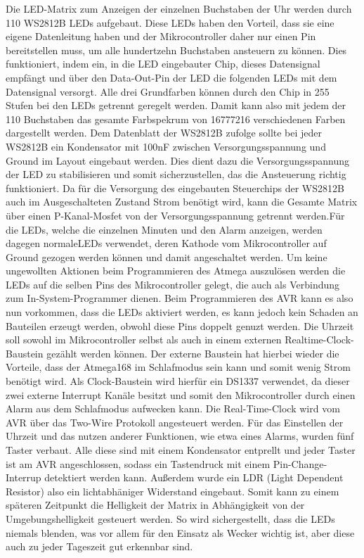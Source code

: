 \documentclass[12pt,journal,compsoc]{IEEEtran}
\begin{document}
Die LED-Matrix zum Anzeigen der einzelnen Buchstaben der Uhr werden durch 110 WS2812B LEDs aufgebaut. Diese LEDs haben den Vorteil, dass sie eine eigene Datenleitung haben und der Mikrocontroller daher nur einen Pin bereitstellen muss, um alle hundertzehn Buchstaben ansteuern zu können. Dies funktioniert, indem ein, in die LED eingebauter Chip, dieses Datensignal empfängt und über den Data-Out-Pin der LED die folgenden LEDs mit dem Datensignal versorgt. Alle drei Grundfarben können durch den Chip in 255 Stufen bei den LEDs getrennt geregelt werden. Damit kann also mit jedem der 110 Buchstaben das gesamte Farbspekrum von 16777216 verschiedenen Farben dargestellt werden. Dem Datenblatt der WS2812B zufolge sollte bei jeder WS2812B ein Kondensator mit 100nF zwischen Versorgungsspannung und Ground im Layout eingebaut werden. Dies dient dazu die Versorgungsspannung der  LED zu stabilisieren und somit sicherzustellen, das die Ansteuerung richtig funktioniert. Da für die Versorgung des eingebauten Steuerchips der WS2812B auch im Ausgeschalteten Zustand Strom benötigt wird, kann die Gesamte Matrix über einen P-Kanal-Mosfet von der Versorgungsspannung getrennt werden.Für die LEDs, welche die einzelnen Minuten und den Alarm anzeigen, werden dagegen \glqq normale\grqq LEDs verwendet, deren Kathode vom Mikrocontroller auf Ground gezogen werden können und damit angeschaltet werden. Um keine ungewollten Aktionen beim Programmieren des Atmega auszulösen werden die LEDs auf die selben Pins des Mikrocontroller gelegt, die auch als Verbindung zum In-System-Programmer dienen. Beim Programmieren des AVR kann es also nun vorkommen, dass  die LEDs aktiviert werden, es kann jedoch kein Schaden an Bauteilen erzeugt werden, obwohl diese Pins doppelt genuzt werden.
Die Uhrzeit soll sowohl im Mikrocontroller selbst als auch in einem externen Realtime-Clock-Baustein gezählt werden können. Der externe Baustein hat hierbei wieder die Vorteile, dass der Atmega168 im Schlafmodus sein kann und somit wenig Strom benötigt wird. Als Clock-Baustein wird hierfür ein DS1337 verwendet, da dieser zwei externe Interrupt Kanäle besitzt und somit den Mikrocontroller durch einen Alarm aus dem Schlafmodus aufwecken kann. Die Real-Time-Clock wird vom AVR über das Two-Wire Protokoll angesteuert werden.
Für das Einstellen der Uhrzeit und das nutzen anderer Funktionen, wie etwa eines Alarms, wurden fünf Taster verbaut. Alle diese sind mit einem Kondensator entprellt und jeder Taster ist am AVR angeschlossen, sodass ein Tastendruck mit einem Pin-Change-Interrup detektiert werden kann. 
Außerdem wurde ein LDR (Light Dependent Resistor) also ein lichtabhäniger Widerstand eingebaut. Somit kann zu einem späteren Zeitpunkt die Helligkeit der Matrix in Abhängigkeit von der Umgebungshelligkeit gesteuert werden. So wird sichergestellt, dass die LEDs niemals blenden, was vor allem für den Einsatz als Wecker wichtig ist, aber diese auch zu jeder Tageszeit gut erkennbar sind.
\end{document}
